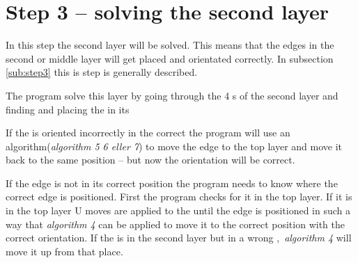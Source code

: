 \section{Step 3 -- solving the second layer}
In this step the second layer will be solved. 
This means that the edges in the second or middle layer will get placed and orientated correctly. 
In subsection \ref{sub:step3} this is step is generally described. 

The program solve this layer by going through the 4 \cubicle{}s of the second layer and finding and placing the \cpiece{} in its \cubicle{}

If the \cpiece is oriented incorrectly in the correct \cubicle{} the program will use an algorithm(\textit{algorithm 5 6 eller 7})  to move the edge \cpiece{} to the top layer and move it back to the same position -- but now the orientation will be correct. 

If the edge \cpiece{} is not in its correct position the program needs to know where the correct edge \cpiece{} is positioned. First the program checks for it in the top layer. 
If it is in the top layer U moves are applied to the \rubik{} until the edge \cpiece{} is positioned in such a way that \textit{algorithm 4} can be applied to move it to the correct position with the correct orientation. 
If the \cpiece{} is in the second layer but in a wrong \cubicle{}, \textit{algorithm 4} will move it up from that place. 
